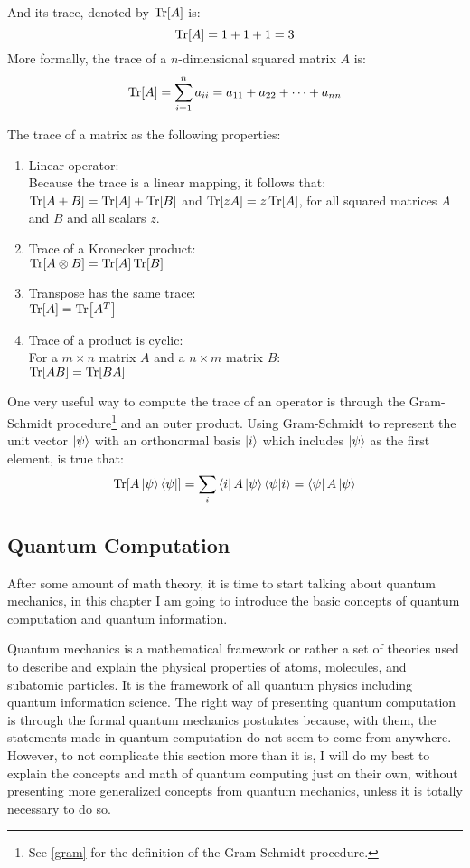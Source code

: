 And its trace, denoted by $\Tr[A]$ is:
$$
\Tr[A] = 1 + 1 + 1 = 3
$$
More formally, the trace of a $n$-dimensional squared matrix $A$ is:
$$
\Tr[A] = \sum_{i=1}^{n} a_{ii} = a_{11} + a_{22} + \cdots + a_{nn}
$$


The trace of a matrix as the following properties:
\begin{enumerate}
	\item Linear operator: \\
	Because the trace is a linear mapping, it follows that:\\
	$\Tr[A+B] = \Tr[A] + \Tr[B]$ and $\Tr[zA] = z \Tr[A]$, for all squared matrices $A$ and $B$ and all scalars $z$.
	\item Trace of a Kronecker product: \\
	$\Tr[A \otimes B] = \Tr[A]\Tr[B]$
	\item Transpose has the same trace: \\
	$\Tr[A]=\Tr[A^T]$
	\item Trace of a product is cyclic: \\
	For a $m \times n$ matrix $A$ and a $n \times m$ matrix $B$:\\
	$\Tr[AB]=\Tr[BA]$
\end{enumerate}

One very useful way to compute the trace of an operator is through the Gram-Schmidt procedure\footnote{See \ref{gram} for the definition of the Gram-Schmidt procedure.} and an outer product. 
Using Gram-Schmidt to represent the unit vector $\ket{\psi}$ with an orthonormal basis $\ket{i}$ which includes $\ket{\psi}$ as the first element, is true that:
$$
\Tr[A\ket{\psi}\bra{\psi}] = \sum_i \bra{i}A\ket{\psi}\bra{\psi}\ket{i} = \bra{\psi}A\ket{\psi}
$$

\subsection{Quantum Computation}
After some amount of math theory, it is time to start talking about quantum mechanics, in this chapter I am going to introduce the basic concepts of quantum computation and quantum information.

Quantum mechanics is a mathematical framework or rather a set of theories used to describe and explain the physical properties of atoms, molecules, and subatomic particles. It is the framework of all quantum physics including quantum information science. The right way of presenting quantum computation is through the formal quantum mechanics postulates because, with them, the statements made in quantum computation do not seem to come from anywhere. However, to not complicate this section more than it is, I will do my best to explain the concepts and math of quantum computing just on their own, without presenting more generalized concepts from quantum mechanics, unless it is totally necessary to do so.

